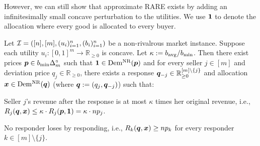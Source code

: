 However, we can still show that approximate RARE exists by adding
an infinitesimally small concave perturbation to the utilities.
We use $\mathbf{1}$ to denote the allocation where every good is allocated to every buyer.

\begin{theorem}
\label{thm:nonrival-rare-exists}
Let $\mathcal{I} = ([n], [m], (u_i)_{i=1}^n, (b_i)_{i=1}^n)$ be a non-rivalrous market instance.
Suppose each utility $u_i: [0,1]^m \to \mathbb{R}_{\ge 0}$ is concave.
Let $\kappa := b_{\operatorname{avg}}/b_{\min}$.
%
Then there exist prices $\bm{p} \in b_{\min}\Delta_m^{\circ}$ such that $\mathbf{1} \in \operatorname{Dem^{\mathrm{NR}}}(\bm{p})$ and
for every seller $j \in [m]$ and deviation price $q_j \in \mathbb{R}_{\ge 0}$,
there exists a response $\bm{q}_{-j} \in \mathbb{R}_{\ge 0}^{[m]\setminus\{j\}}$ and allocation $\bm{x} \in \operatorname{Dem^{\mathrm{NR}}}(\bm{q})$
(where $\bm{q} := (q_j, \bm{q}_{-j})$) such that:
\begin{tightenum}
\item Seller $j$'s revenue after the response is at most $\kappa$ times her original revenue, i.e.,
    $R_j(\bm{q}, \bm{x}) \le \kappa \cdot R_j(\bm{p}, \mathbf{1}) = \kappa \cdot n p_j$.
\item No responder loses by responding, i.e., $R_k(\bm{q}, \bm{x}) \ge n p_k$
    for every responder $k \in [m] \setminus \{j\}$.
\end{tightenum}
\end{theorem}
